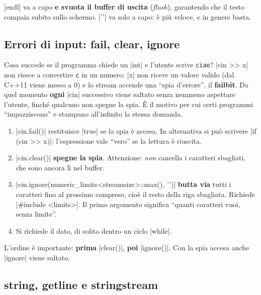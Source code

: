 \cc|endl| va a capo \textbf{e svuota il buffer di uscita} (\emph{flush}),
garantendo che il testo compaia subito sullo schermo. \cc|'\n'| va solo a capo:
è più veloce, e in genere basta.

\subsection*{Errori di input: fail, clear, ignore}

Cosa succede se il programma chiede un \cc|int| e l'utente scrive \texttt{ciao}?
\cc|cin >> x| non riesce a convertire \texttt{c} in un numero: \cc|x| non riceve
un valore valido (dal C++11 viene messo a 0) e lo stream accende una
``spia d'errore'', il \textbf{failbit}. Da quel momento \textbf{ogni} \cc|cin|
successivo viene saltato senza nemmeno aspettare l'utente, finché qualcuno non
spegne la spia. È il motivo per cui certi programmi ``impazziscono'' e
stampano all'infinito la stessa domanda.

\begin{passopasso}
\begin{enumerate}
  \item \cc|cin.fail()| restituisce \cc|true| se la spia è accesa. In alternativa
        si può scrivere \cc|if (cin >> x)|: l'espressione vale ``vero'' se la
        lettura è riuscita.
  \item \cc|cin.clear()| \textbf{spegne la spia}. Attenzione: \emph{non} cancella
        i caratteri sbagliati, che sono ancora lì nel buffer.
  \item \cc|cin.ignore(numeric_limits<streamsize>::max(), '\n')| \textbf{butta via}
        tutti i caratteri fino al prossimo \nl{} compreso, cioè il resto della
        riga sbagliata. Richiede \cc|#include <limits>|. Il primo argomento
        significa ``quanti caratteri vuoi, senza limite''.
  \item Si richiede il dato, di solito dentro un ciclo \cc|while|.
\end{enumerate}
L'ordine è importante: \textbf{prima} \cc|clear()|, \textbf{poi} \cc|ignore()|.
Con la spia accesa anche \cc|ignore| viene saltato.
\end{passopasso}

\subsection*{string, getline e stringstream}

